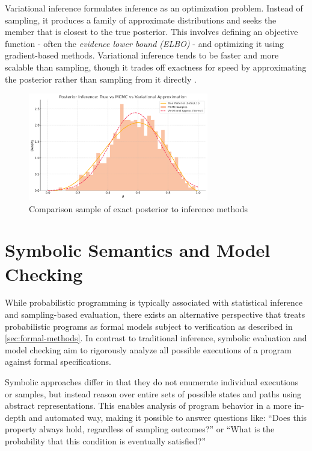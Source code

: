 Variational inference formulates inference as an optimization problem. Instead of sampling, it produces a family of approximate distributions and seeks the member that
is closest to the true posterior. This involves defining an objective function - often the \textit{evidence lower bound (ELBO)} - and optimizing it using gradient-based methods.
Variational inference tends to be faster and more scalable than sampling, though it trades off exactness for speed by approximating the posterior rather than sampling
from it directly \cite{blei2017vi}.


\begin{figure}[htbp]
  \centering
  \includegraphics[width=0.7\textwidth]{graphics/inferencePlot.png}
  \caption{Comparison sample of exact posterior to inference methods}
  \label{fig:inference_plot}
\end{figure}

\section{Symbolic Semantics and Model Checking}

While probabilistic programming is typically associated with statistical inference and sampling-based evaluation, there exists an alternative perspective
that treats probabilistic programs as formal models subject to verification \cite{2025modelcheckingprobabilisticoperator,sato2019formal} as described in \ref{sec:formal-methods}.
In contrast to traditional inference, symbolic evaluation and model checking aim to rigorously analyze all possible executions of a program against formal specifications.

Symbolic approaches differ in that they do not enumerate individual executions or samples, but instead reason over entire sets of possible states and paths using
abstract representations. This enables analysis of program behavior in a more in-depth and automated way, making it possible to answer questions like:
“Does this property always hold, regardless of sampling outcomes?” or “What is the probability that this condition is eventually satisfied?”

